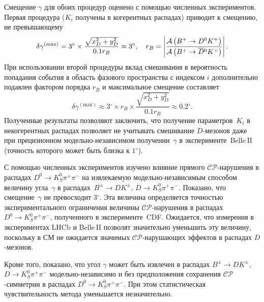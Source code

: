 \documentclass[a4paper,14pt]{extarticle} %
\newcommand{\dn}{\ensuremath{D^0}\xspace}
\newcommand{\dbar}{\ensuremath{\overline{D}}\xspace}
\newcommand{\dnbar}{\ensuremath{\dbar{}^0}\xspace}
\newcommand{\ks}{\ensuremath{K_S^0}\xspace}
\newcommand{\gphi}{\ensuremath{\gamma}\xspace}
\newcommand{\lbr}{\ensuremath{\left(}}
\newcommand{\rbr}{\ensuremath{\right)}}
\newcommand{\bdk}{\ensuremath{B^{\pm}\to D K^{\pm}}\xspace}
\newcommand{\rb}{\ensuremath{r_B}\xspace}
\newcommand{\dkpp}{\ensuremath{D\to\ks\pi^+\pi^-}\xspace}
\newcommand{\dnkpp}{\ensuremath{\dn\to\ks\pi^+\pi^-}\xspace}
\newcommand{\mca}{\ensuremath{\mathcal{A}}\xspace}
\newcommand{\cpconj}{\ensuremath{\mathcal{CP}}\xspace}
\newcommand{\ki}{\ensuremath{K_i}\xspace}
\newcommand{\grad}{\ensuremath{^{\circ}}\xspace}
\newcommand{\belle}{\ensuremath{\mathrm{Belle}}\xspace}
\newcommand{\belleii}{\ensuremath{\belle\:\mathrm{II}}\xspace}
\newcommand{\lhcb}{\ensuremath{\mathrm{LHCb}}\xspace}
\begin{document}
Смещение \gphi для обоих процедур оценено с помощью численных экспериментов.  Первая процедура (\ki получены в когерентных распадах) приводит к смещению, не превышающему
\begin{equation}
 \delta\gphi^{(\mathrm{max})} = 3\grad\times \frac{\sqrt{x_D^2+y_D^2}}{0.1\rb}\approx 3\grad,\quad \rb = \left|\frac{\mca\lbr B^+\to\dn K^+\rbr}{\mca\lbr B^+\to\dnbar K^+\rbr}\right|.
\end{equation}
При использовании второй процедуры вклад смешивания в вероятность попадания события в область фазового пространства с индексом $i$ дополнительно подавлен фактором порядка \rb и максимальное смещение составляет
\begin{equation}
 \delta\gphi^{(\mathrm{max})} \approx 3\grad\times\rb\times \frac{\sqrt{x_D^2+y_D^2}}{0.1\rb}\approx 0.2\grad.
\end{equation}
Полученные результаты позволяют заключить, что получение параметров~\ki в некогерентных распадах позволяет не учитывать смешивание $D$-мезонов даже при прецизионном модельно-независимом получении~\gphi в эксперименте~\belleii (точность которого может быть близка к $1\grad$).  

С помощью численных экспериментов изучено влияние прямого \cpconj-нарушения в распадах \dnkpp на извлекаемую модельно-независимым способом величину угла~\gphi в распадах~\bdk, \dkpp.  Показано, что смещение~\gphi не превосходит $3\grad$.  Эта величина определяется точностью экспериментального ограничения величины \cpconj-нарушения в распадах \dnkpp, полученного в эксперименте~CDF.  Ожидается, что измерения в экспериментах \lhcb и \belleii позволят значительно уменьшить эту величину, поскольку в СМ не ожидается значимых \cpconj-нарушающих эффектов в распадах $D$-мезонов.  

Кроме того, показано, что угол \gphi может быть извлечен в распадах \bdk, \dkpp модельно-независимо и без предположения сохранения \cpconj-симметрии в распадах \dnkpp. При этом статистическая чувствительность метода уменьшается незначительно.
\end{document}

